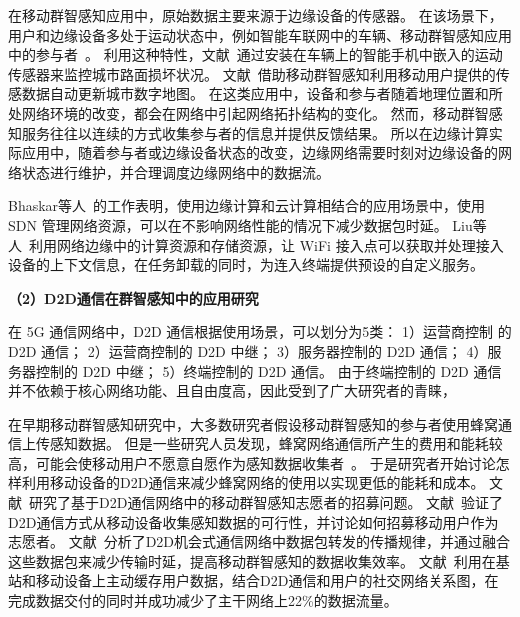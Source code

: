 在移动群智感知应用中，原始数据主要来源于边缘设备的传感器。
在该场景下，用户和边缘设备多处于运动状态中，例如智能车联网中的车辆、移动群智感知应用中的参与者~\cite{DBLP:journals/jsac/LyuNTLWGP17}。
利用这种特性，文献~通过安装在车辆上的智能手机中嵌入的运动传感器来监控城市路面损坏状况。
文献~借助移动群智感知利用移动用户提供的传感数据自动更新城市数字地图。
在这类应用中，设备和参与者随着地理位置和所处网络环境的改变，都会在网络中引起网络拓扑结构的变化。
然而，移动群智感知服务往往以连续的方式收集参与者的信息并提供反馈结果。
所以在边缘计算实际应用中，随着参与者或边缘设备状态的改变，边缘网络需要时刻对边缘设备的网络状态进行维护，并合理调度边缘网络中的数据流。

Bhaskar等人~\cite{DBLP:conf/infocom/RimalVM16}的工作表明，使用边缘计算和云计算相结合的应用场景中，使用 SDN 管理网络资源，可以在不影响网络性能的情况下减少数据包时延。
Liu等人~\cite{DBLP:conf/edge/LiuWB16}利用网络边缘中的计算资源和存储资源，让 WiFi 接入点可以获取并处理接入设备的上下文信息，在任务卸载的同时，为连入终端提供预设的自定义服务。



\textbf{（2）D2D通信在群智感知中的应用研究}

在 5G 通信网络中，D2D 通信根据使用场景，可以划分为5类：
1）运营商控制 的 D2D 通信；%
2）运营商控制的 D2D 中继；%
3）服务器控制的 D2D 通信；%
4）服务器控制的 D2D 中继；%
5）终端控制的 D2D 通信。%
由于终端控制的 D2D 通信并不依赖于核心网络功能、且自由度高，因此受到了广大研究者的青睐，

在早期移动群智感知研究中，大多数研究者假设移动群智感知的参与者使用蜂窝通信上传感知数据。
但是一些研究人员发现，蜂窝网络通信所产生的费用和能耗较高，可能会使移动用户不愿意自愿作为感知数据收集者~\cite{DBLP:conf/globecom/ZhangJLLC16,DBLP:conf/icdcs/XiaoWHHH16}。
于是研究者开始讨论怎样利用移动设备的D2D通信来减少蜂窝网络的使用以实现更低的能耗和成本。
文献~研究了基于D2D通信网络中的移动群智感知志愿者的招募问题。
文献~验证了D2D通信方式从移动设备收集感知数据的可行性，并讨论如何招募移动用户作为志愿者。 
文献~分析了D2D机会式通信网络中数据包转发的传播规律，并通过融合这些数据包来减少传输时延，提高移动群智感知的数据收集效率。
文献~利用在基站和移动设备上主动缓存用户数据，结合D2D通信和用户的社交网络关系图，在完成数据交付的同时并成功减少了主干网络上22\%的数据流量。

